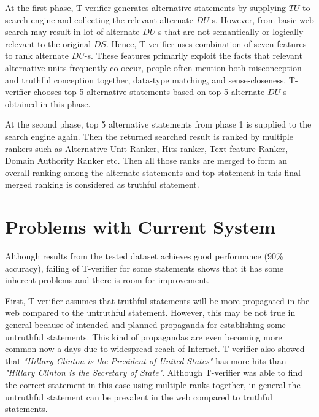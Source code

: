 \documentclass[11pt]{article}
\begin{document}
At the first phase, T-verifier generates alternative statements by supplying
$TU$ to search engine and collecting the relevant alternate $DU$-s. However,
from basic web search may result in lot of alternate $DU$-s that are not semantically or
logically relevant to the original $DS$. Hence, T-verifier uses combination of
seven features to rank alternate $DU$-s. These features primarily exploit the facts
that relevant alternative units frequently co-occur, people often mention both
misconception and truthful conception together, data-type matching, and
sense-closeness. T-verifier chooses top 5 alternative statements based on top 5
alternate $DU$-s obtained in this phase.

At the second phase, top 5 alternative statements from phase 1 is supplied to the
search engine again. Then the returned searched result is ranked by multiple
rankers such as Alternative Unit Ranker, Hits ranker, Text-feature Ranker, Domain
Authority Ranker etc. Then all those ranks are merged to form an overall ranking
among the alternate statements and top statement in this final merged ranking is
considered as truthful statement.


\section{Problems with Current System}
Although results from the tested dataset achieves good performance (90\%
accuracy), failing of T-verifier for some statements shows that it has some
inherent problems and there is room for improvement.

First, T-verifier assumes that truthful statements will be more propagated in the
web compared to the untruthful statement. However, this may be not true in
general because of intended and planned propaganda for establishing some
untruthful statements. This kind of propagandas are even becoming more common now
a days due to widespread reach of Internet. T-verifier also showed that \emph{"Hillary
Clinton is the President of United States"} has more hits than \emph{"Hillary Clinton is
the Secretary of State"}. Although T-verifier was able to find the correct
statement in this case using multiple ranks together, in general the untruthful
statement can be prevalent in the web compared to truthful statements.
\end{document}
